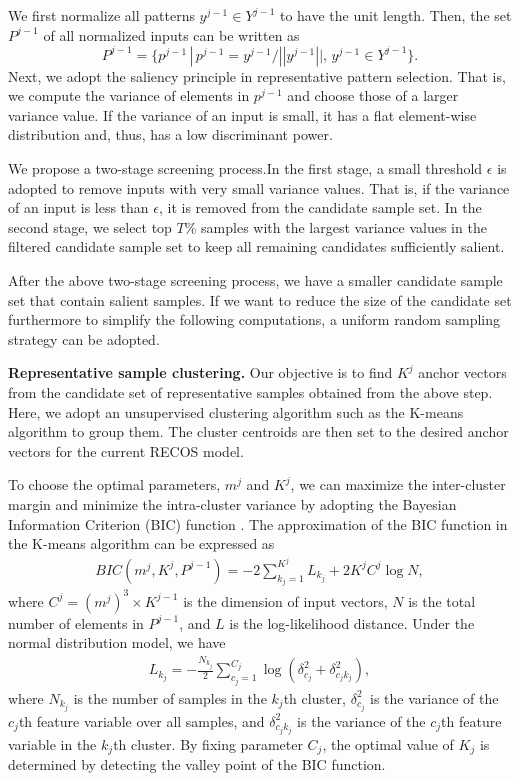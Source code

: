 \documentclass[preprint,12pt]{elsarticle}
\begin{document}
We first normalize all patterns $y^{j-1} \in Y^{j-1}$ to have the unit 
length. Then, the set $P^{j-1}$ of all normalized inputs can be written as
$$
P^{j-1} = \{ p^{j-1} \, | \, p^{j-1} = y^{j-1}/||y^{j-1}||, 
\, y^{j-1} \in Y^{j-1} \}.
$$
Next, we adopt the saliency principle in representative pattern
selection.  That is, we compute the variance of elements in $p^{j-1}$
and choose those of a larger variance value. If the variance of an input
is small, it has a flat element-wise distribution and, thus, has a low
discriminant power. 

We propose a two-stage screening process.In the first stage, a small
threshold $\epsilon$ is adopted to remove inputs with very small
variance values. That is, if the variance of an input is less than
$\epsilon$, it is removed from the candidate sample set.  In the second
stage, we select top $T\%$ samples with the largest variance values in
the filtered candidate sample set to keep all remaining candidates
sufficiently salient. 

After the above two-stage screening process, we have a smaller candidate
sample set that contain salient samples. If we want to reduce the size
of the candidate set furthermore to simplify the following computations,
a uniform random sampling strategy can be adopted.

{\bf Representative sample clustering.} Our objective is to find $K^j$
anchor vectors from the candidate set of representative samples obtained
from the above step. Here, we adopt an unsupervised clustering algorithm
such as the K-means algorithm to group them. The cluster centroids are
then set to the desired anchor vectors for the current RECOS model. 

To choose the optimal parameters, $m^j$ and $K^j$, we can maximize the
inter-cluster margin and minimize the intra-cluster variance by adopting
the Bayesian Information Criterion (BIC) function \cite{pelleg2000x}.
The approximation of the BIC function in the K-means algorithm can
be expressed as
\begin{align} \label{eq.BIC}
BIC(m^j, K^j, P^{j-1}) = -2\sum_{k_j = 1}^{K^j}{L_{k_j}} + 2K^jC^j\log{N},  
\end{align} 
where $C^j = (m^j)^3 \times K^{j-1}$ is the dimension of input vectors,
$N$ is the total number of elements in $P^{j-1}$, and $L$ is the
log-likelihood distance. Under the normal distribution model, we have
\begin{align} \label{eq.LogLikelihood} 
L_{k_j} = -\frac{N_{k_j}}{2}\sum_{c_j=1}^{C_j}\log(\delta_{c_j}^2 + 
\delta_{c_jk_j}^2),
\end{align} 
where $N_{k_j}$ is the number of samples in the $k_j$th cluster,
$\delta_{c_j}^2$ is the variance of the $c_j$th feature variable over
all samples, and $\delta_{c_jk_j}^2$ is the variance of the $c_j$th
feature variable in the $k_j$th cluster. By fixing parameter $C_j$, the
optimal value of $K_j$ is determined by detecting the valley point of
the BIC function. 
\end{document}
